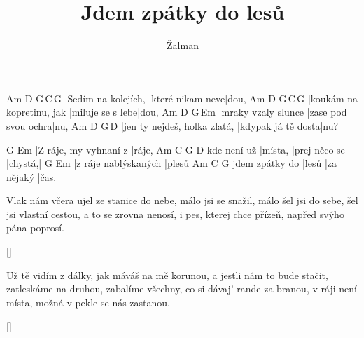 \documentclass{song}
\title{Jdem zpátky do lesů}
\author{Žalman}
\begin{document}
\strophe
Am\7                D\7              G\,C\,G
|Sedím na kolejích, |které nikam neve|dou,
Am\7                      D\7              G\,C\,G
|koukám na kopretinu, jak |miluje se s lebe|dou,
Am\7                D\7                 G\,Em
|mraky vzaly slunce |zase pod svou ochra|nu,
Am\7                         D\7                G\,D\7
|jen ty nejdeš, holka zlatá, |kdypak já tě dosta|nu?
\endstrophe

G                     Em
|Z ráje, my vyhnaní z |ráje,
            Am\7    C             G       D\7
kde není už |místa, |prej něco se |chystá,|
G                    Em
|z ráje nablýskaných |plesů
               Am\7  C          G
jdem zpátky do |lesů |za nějaký |čas.
\endstrophe

\strophe*
Vlak nám včera ujel ze stanice do nebe,
málo jsi se snažil, málo šel jsi do sebe,
šel jsi vlastní cestou, a to se zrovna nenosí,
i pes, kterej chce přízeň, napřed svýho pána poprosí.
\endstrophe

\ref{}

\strophe*
Už tě vidím z dálky, jak máváš na mě korunou,
a jestli nám to bude stačit, zatleskáme na druhou,
zabalíme všechny, co si dávaj' rande za branou,
v ráji není místa, možná v pekle se nás zastanou.
\endstrophe

\ref{}
\end{document}
